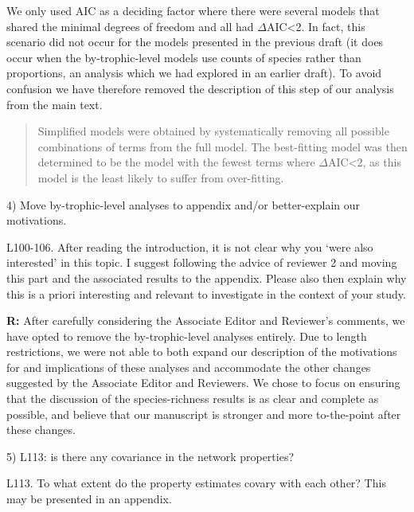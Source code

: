 \documentclass[12pt]{letter}
\newenvironment{refquote}{\bigskip \begin{it}}{\end{it}\smallskip}
\begin{document}
  We only used AIC as a deciding factor where
  there were several models that shared the minimal degrees 
  of freedom and all had $\Delta$AIC\textless2. In fact, 
  this scenario did not occur for the models presented in 
  the previous draft (it does occur when the 
  by-trophic-level models use counts of species rather than
  proportions, an analysis which we had explored in an 
  earlier draft). To avoid confusion we have therefore 
  removed the description of this step of our analysis from 
  the main text. 


  \begin{quotation}

    Simplified models were obtained by systematically 
    removing all possible combinations of terms from the 
    full model. The best-fitting model was then determined 
    to be the model with the fewest terms where 
    $\Delta$AIC\textless2, as this model is the least likely 
    to suffer from over-fitting. 

  \end{quotation}


  4) Move by-trophic-level analyses to appendix and/or better-explain our motivations.

  \begin{refquote}

    L100-106. After reading the introduction, it is not clear why you ‘were
    also interested’ in this topic. I suggest following the advice of reviewer
    2 and moving this part and the associated results to the appendix. Please
    also then explain why this is a priori interesting and relevant to
    investigate in the context of your study.

  \end{refquote}

  \textbf{R:} After carefully considering the Associate 
  Editor and Reviewer's comments, we have opted to remove
  the by-trophic-level analyses entirely. Due to length
  restrictions, we were not able to both expand our 
  description of the motivations for and implications of
  these analyses and accommodate the other changes suggested
  by the Associate Editor and Reviewers. We chose to focus
  on ensuring that the discussion of the species-richness
  results is as clear and complete as possible, and believe
  that our manuscript is stronger and more to-the-point
  after these changes. 


  5) L113: is there any covariance in the network properties?

  \begin{refquote}

    L113. To what extent do the property estimates covary with each other?
    This may be presented in an appendix.

  \end{refquote}
\end{document}
